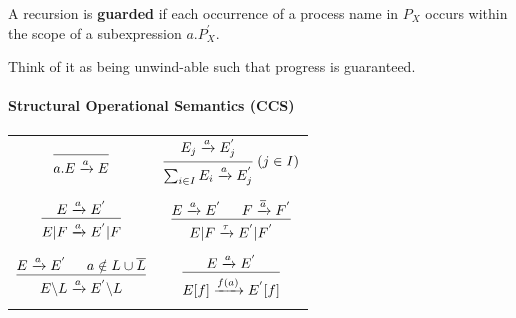 \documentclass[99-notes-packed.tex]{subfiles}
\begin{document}
\begin{definition}
    A recursion is \textbf{guarded} if each occurrence of a process name in $P_X$ occurs within the scope of a subexpression $a.P^{'}_X$. 
    
    Think of it as being unwind-able such that progress is guaranteed.
\end{definition}

\paragraph*{Structural Operational Semantics (CCS)}
\begin{center}
    \begin{tabular}{cc}
        $
        \begin{prooftree}
            \infer0{a.E \xrightarrow{a} E}
        \end{prooftree}
        $   &
        $
        \begin{prooftree}
            \hypo{E_j \xrightarrow{a} E_j^{'}}
            \infer1{\sum_{i \in I}E_i \xrightarrow{a} E_j^{'}}
        \end{prooftree}\ (j \in I)
        $   \\
        \\
        $
        \begin{prooftree}
            \hypo{E \xrightarrow{a} E^{'}}
            \infer1{E | F \xrightarrow{a} E^{'} | F}
        \end{prooftree}
        $   &
        $
        \begin{prooftree}
            \hypo{E \xrightarrow{a} E^{'}}
            \hypo{F \xrightarrow{\overline{a}} F^{'}}
            \infer2{E | F \xrightarrow{\tau} E^{'} | F^{'}}
        \end{prooftree}
        $   \\
        \\
        $
        \begin{prooftree}
            \hypo{E \xrightarrow{a} E^{'}}
            \hypo{a \notin L \cup \overline{L}}
            \infer2{E{\backslash}L \xrightarrow{a} E^{'}{\backslash}L}
        \end{prooftree}
        $   &
        $
        \begin{prooftree}
            \hypo{E \xrightarrow{a} E^{'}}
            \infer1{E[f] \xrightarrow{f(a)} E^{'}[f]}
        \end{prooftree}
        $   \\
        \\
    \end{tabular}
\end{center}
\end{document}
